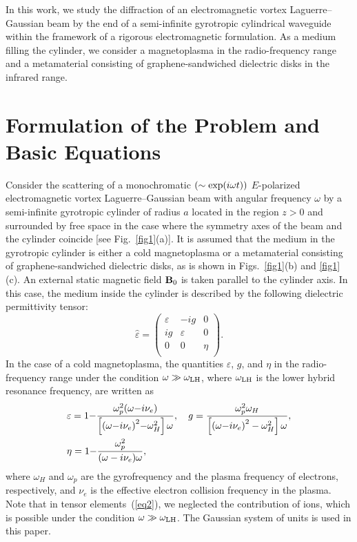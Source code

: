 \documentclass[conference,a4paper]{IEEEtran}
\begin{document}
In this work, we study the diffraction of an electromagnetic vortex Laguerre--Gaussian beam by the end of a semi-infinite gyrotropic cylindrical waveguide within the framework of a rigorous electromagnetic formulation. As a medium filling the cylinder, we consider a magnetoplasma in the radio-frequency range and a metamaterial consisting of graphene-sandwiched dielectric disks in the infrared range.


\section{Formulation of the Problem and Basic Equations}
Consider the scattering of a monochromatic $(\sim\exp(i\omega t))$ $E$-polarized electromagnetic vortex Laguerre--Gaussian beam with angular frequency $\omega$ by a semi-infinite gyrotropic cylinder of radius $a$ located in the region $z>0$ and surrounded by free space in the case where the symmetry axes of the beam and the cylinder coincide [see Fig.~\ref{fig1}(a)]. It is assumed that the medium in the gyrotropic cylinder is either a cold  magnetoplasma or a metamaterial consisting of graphene-sandwiched dielectric disks, as is shown in Figs.~\ref{fig1}(b) and \ref{fig1}(c). An external static magnetic field ${\bf B}_0$ is taken parallel to the cylinder axis. In this case, the medium inside the cylinder is described by the following dielectric permittivity tensor:
\begin{equation}\label{eq1}
{\hat \varepsilon} =
\left(\begin{array}{ccc}
\varepsilon & -i g& 0 \\
i g & \varepsilon & 0 \\
0 & 0 & \eta \\
\end{array} \right).
\end{equation}
In the case of a cold magnetoplasma, the quantities $\varepsilon$, $g$, and $\eta$ in the radio-frequency range under the condition $\omega\gg \omega_{\rm LH}$, where $\omega_{\rm LH}$ is the lower hybrid resonance frequency, are written as~\cite{Ginzburg1970}
\begin{align}\label{eq2}
&\varepsilon = 1 {-} \frac{{\omega_p^2(\omega {-} i\nu_{e} )}}{{\left[ {{{(\omega {-} {i}\nu_{e} )}^2} {-} \omega_{H}^2} \right]\omega }},\quad g = \frac{{\omega _p^2{\omega_{H}}}}{{\left[ {{{(\omega {-} i\nu_{e} )}^2} - \omega_{H}^2} \right]\omega }},\notag\\
&\eta= 1 {-} \frac{{\omega_p^2}}{{(\omega  - i\nu_{e} )\omega }},
\end{align}
where $\omega_{H}$ and $\omega_p$ are the  gyrofrequency and the plasma frequency of electrons, respectively, and $\nu_{e}$ is the effective electron collision frequency in the plasma. Note that in tensor elements~(\ref{eq2}), we neglected the contribution of ions, which is possible under the condition $\omega\gg\omega_{\rm LH}$.
The Gaussian system of units is used in this paper.
\end{document}
